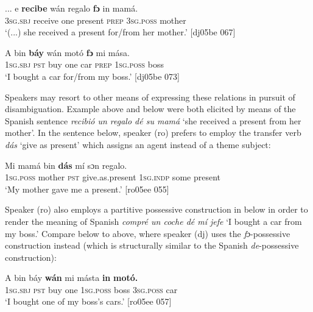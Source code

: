 \ea%
    \label{ex:key:982}
    \gll \op...\cp{}  e    \textbf{recibe}  wán  regalo  \textbf{fɔ} in    mamá.\\
{}  \textsc{3sg.sbj}  receive  one  present  \textsc{prep}  \textsc{3sg.poss}  mother\\

\glt ‘(...) she received a present for/from her mother.’ [dj05be 067]
\z


\ea%
    \label{ex:key:983}
    \gll A    bin  \textbf{báy}  wán  motó  \textbf{fɔ} mi    mása.\\
\textsc{1sg.sbj}  \textsc{pst}  buy  one  car    \textsc{prep}  \textsc{1sg.poss}  boss\\

\glt ‘I bought a car for/from my boss.’ [dj05be 073]
\z

Speakers may resort to other means of expressing these relations in pursuit of disambiguation. Example  above and  below were both elicited by means of the Spanish sentence \textit{recibió un regalo dé su mamá} ‘she received a present from her mother’. In the sentence below, speaker (ro) prefers to employ the transfer verb \textit{dás} ‘give as present’ which assigns an agent instead of a theme subject: 


\ea%
    \label{ex:key:984}
    \gll Mi    mamá  bin  \textbf{dás}        mí    sɔn    regalo.\\
\textsc{1sg.poss}  mother  \textsc{pst}  give.as.present  \textsc{1sg.indp}  some  present\\

\glt ‘My mother gave me a present.’ [ro05ee 055]
\z

Speaker (ro) also employs a partitive possessive construction in  below in order to render the meaning of Spanish \textit{compré un coche dé mí jefe} ‘I bought a car from my boss.’ Compare  below to  above, where speaker (dj) uses the \textit{fɔ}{}-possessive construction instead (which is structurally similar to the Spanish \textit{de}{}-possessive construction):


\ea%
    \label{ex:key:985}
    \gll A    bin  báy  \textbf{wán} mi    másta \textbf{in} \textbf{motó}\textbf{\textmd{.}}\\
\textsc{1sg.sbj}  \textsc{pst}  buy  one    \textsc{1sg.poss}  boss    \textsc{3sg.poss}  car\\

\glt ‘I bought one of my boss’s cars.’ [ro05ee 057]
\z

